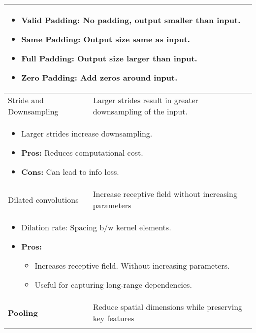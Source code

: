 \begin{summary}
\begin{center}
\begin{tabular}{ll}
            \multicolumn{2}{p{\linewidth}}{
                \begin{itemize}
                    \item Valid Padding: No padding, output smaller than input.
                    \item Same Padding: Output size same as input.
                    \item Full Padding: Output size larger than input.
                    \item Zero Padding: Add zeros around input.
                \end{itemize}} \\
            \midrule 
            Stride and Downsampling & Larger strides result in greater downsampling of the input. \\
            \multicolumn{2}{p{\linewidth}}{
                \begin{itemize}
                    \item Larger strides increase downsampling.
                    \item \textbf{Pros:} Reduces computational cost.
                    \item \textbf{Cons:} Can lead to info loss.
                \end{itemize}} \\
            \midrule
            Dilated convolutions & Increase receptive field without increasing parameters \\
            \multicolumn{2}{p{\linewidth}}{
                \begin{itemize}
                    \item Dilation rate: Spacing b/w kernel elements. 
                    \item \textbf{Pros:}
                    \begin{itemize}
                        \item Increases receptive field. Without increasing parameters.
                        \item Useful for capturing long-range dependencies.
                    \end{itemize}
                \end{itemize}} \\
            \toprule
            \textbf{Pooling} & Reduce spatial dimensions while preserving key features \\
            \multicolumn{2}{p{\linewidth}}{
                \begin{itemize}

\end{itemize}}
\end{tabular}
\end{center}
\end{summary}
